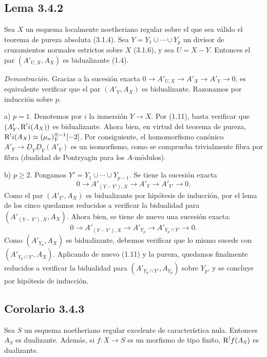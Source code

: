 \subsection*{Lema 3.4.2}
Sea $X$ un esquema localmente noetheriano regular sobre el que sea válido el teorema de pureza absoluta (3.1.4). Sea $Y = Y_1 \cup \cdots \cup Y_p$ un divisor de cruzamientos normales estrictos sobre $X$ (3.1.6), y sea $U = X - Y$. Entonces el par $(A'_{U,X}, A_X)$ es bidualizante (1.4).

\emph{Demostración.} Gracias a la sucesión exacta $0 \to A'_{U,X} \to A'_X \to A'_Y \to 0$, es equivalente verificar que el par $(A'_Y, A_X)$ es bidualizante. Razonamos por inducción sobre $p$.

a) $p = 1$. Denotemos por $i$ la inmersión $Y \to X$. Por (1.11), basta verificar que $(A'_Y, \mathrm{R}^{!}i(A_X))$ es bidualizante. Ahora bien, en virtud del teorema de pureza, $\mathrm{R}^{!}i(A_X) \simeq (\mu_n)^{\otimes -1}_Y[-2]$. Por consiguiente, el homomorfismo canónico $A'_Y \to \underline{D}_Y \underline{D}_Y(A'_Y)$ es un isomorfismo, como se comprueba trivialmente fibra por fibra (dualidad de Pontryagin para los $A$-módulos).

b) $p \geqslant 2$. Pongamos $Y' = Y_1 \cup \cdots \cup Y_{p-1}$. Se tiene la sucesión exacta
\[
0 \longrightarrow A'_{(Y-Y'),X} \longrightarrow A'_Y \longrightarrow A'_{Y'} \longrightarrow 0.
\]
Como el par $(A'_{Y'}, A_X)$ es bidualizante por hipótesis de inducción, por el lema de los cinco quedamos reducidos a verificar la bidualidad para $(A'_{(Y-Y'),X}, A_X)$. Ahora bien, se tiene de nuevo una sucesión exacta:
\[
0 \longrightarrow A'_{(Y-Y'),X} \longrightarrow A'_{Y_p} \longrightarrow A'_{Y_p \cap Y'} \longrightarrow 0.
\]
Como $(A'_{Y_p}, A_X)$ es bidualizante, debemos verificar que lo mismo sucede con $(A'_{Y_p \cap Y'}, A_X)$. Aplicando de nuevo (1.11) y la pureza, quedamos finalmente reducidos a verificar la bidualidad para $(A'_{Y_p \cap Y'}, A_{Y_p})$ sobre $Y_p$, y se concluye por hipótesis de inducción.

\subsection*{Corolario 3.4.3}
Sea $S$ un esquema noetheriano regular excelente de característica nula. Entonces $A_S$ es dualizante. Además, si $f : X \to S$ es un morfismo de tipo finito, $\mathrm{R}^{!}f(A_S)$ es dualizante.

